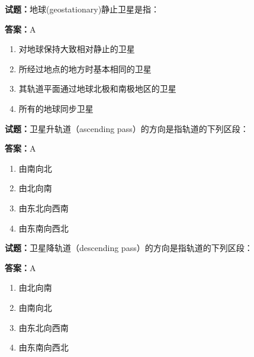 \documentclass{ctexbook}
\begin{document}





\vspace{1em}

\textbf{试题：}地球(geostationary)静止卫星是指： 

\textbf{答案：}A 

\begin{enumerate}[leftmargin=3em]
  \item 对地球保持大致相对静止的卫星 

  \item 所经过地点的地方时基本相同的卫星 

  \item 其轨道平面通过地球北极和南极地区的卫星 

  \item 所有的地球同步卫星 

\end{enumerate}





\vspace{1em}

\textbf{试题：}卫星升轨道（ascending pass）的方向是指轨道的下列区段： 

\textbf{答案：}A 

\begin{enumerate}[leftmargin=3em]
  \item 由南向北 

  \item 由北向南 

  \item 由东北向西南 

  \item 由东南向西北 

\end{enumerate}





\vspace{1em}

\textbf{试题：}卫星降轨道（descending pass）的方向是指轨道的下列区段： 

\textbf{答案：}A 

\begin{enumerate}[leftmargin=3em]
  \item 由北向南 

  \item 由南向北 

  \item 由东北向西南 

  \item 由东南向西北 

\end{enumerate}
\end{document}
